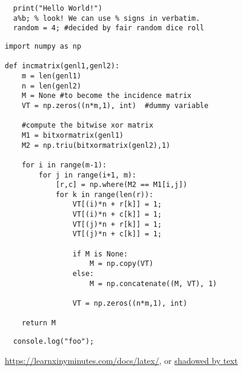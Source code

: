\documentclass[16pt]{article}
\begin{document}
\begin{verbatim}
  print("Hello World!")
  a%b; % look! We can use % signs in verbatim.
  random = 4; #decided by fair random dice roll
\end{verbatim}

\begin{verbatim}
import numpy as np

def incmatrix(genl1,genl2):
    m = len(genl1)
    n = len(genl2)
    M = None #to become the incidence matrix
    VT = np.zeros((n*m,1), int)  #dummy variable

    #compute the bitwise xor matrix
    M1 = bitxormatrix(genl1)
    M2 = np.triu(bitxormatrix(genl2),1)

    for i in range(m-1):
        for j in range(i+1, m):
            [r,c] = np.where(M2 == M1[i,j])
            for k in range(len(r)):
                VT[(i)*n + r[k]] = 1;
                VT[(i)*n + c[k]] = 1;
                VT[(j)*n + r[k]] = 1;
                VT[(j)*n + c[k]] = 1;

                if M is None:
                    M = np.copy(VT)
                else:
                    M = np.concatenate((M, VT), 1)

                VT = np.zeros((n*m,1), int)

    return M
\end{verbatim}

\begin{verbatim}
  console.log("foo");
\end{verbatim}


\url{https://learnxinyminutes.com/docs/latex/}, or
\href{https://learnxinyminutes.com/docs/latex/}{shadowed by text}
\end{document}
